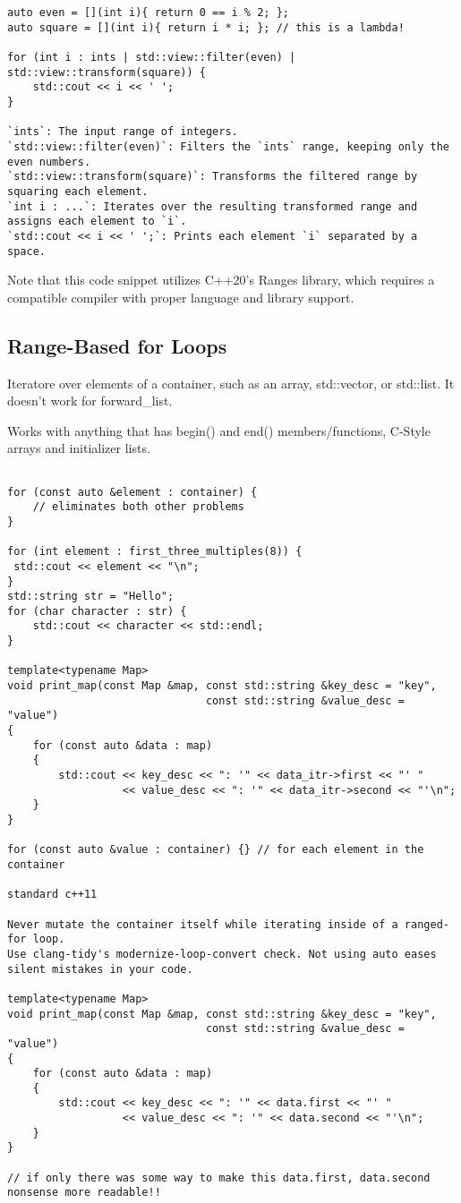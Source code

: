 \begin{verbatim}
auto even = [](int i){ return 0 == i % 2; };
auto square = [](int i){ return i * i; }; // this is a lambda!

for (int i : ints | std::view::filter(even) | std::view::transform(square)) {
    std::cout << i << ' ';
}

`ints`: The input range of integers.
`std::view::filter(even)`: Filters the `ints` range, keeping only the even numbers.
`std::view::transform(square)`: Transforms the filtered range by squaring each element.
`int i : ...`: Iterates over the resulting transformed range and assigns each element to `i`.
`std::cout << i << ' ';`: Prints each element `i` separated by a space.
\end{verbatim}

Note that this code snippet utilizes C++20's Ranges library, which requires a compatible compiler with proper language and library support.

\subsection{Range-Based for Loops}


Iteratore over elements of a container, such as an array, std::vector, or std::list. It doesn't work for forward\_list.


Works with anything that has begin()
and end() members/functions, C-Style arrays and initializer lists.

\begin{verbatim}

for (const auto &element : container) {
    // eliminates both other problems
}

for (int element : first_three_multiples(8)) {
 std::cout << element << "\n";
}
std::string str = "Hello";
for (char character : str) {
    std::cout << character << std::endl;
}

template<typename Map>
void print_map(const Map &map, const std::string &key_desc = "key",
                               const std::string &value_desc = "value")
{
    for (const auto &data : map)
    {
        std::cout << key_desc << ": '" << data_itr->first << "' "
                  << value_desc << ": '" << data_itr->second << "'\n";
    }
}

for (const auto &value : container) {} // for each element in the container

standard c++11

Never mutate the container itself while iterating inside of a ranged-for loop. 
Use clang-tidy's modernize-loop-convert check. Not using auto eases silent mistakes in your code.

template<typename Map>
void print_map(const Map &map, const std::string &key_desc = "key",
                               const std::string &value_desc = "value")
{
    for (const auto &data : map)
    {
        std::cout << key_desc << ": '" << data.first << "' "
                  << value_desc << ": '" << data.second << "'\n";
    }
}

// if only there was some way to make this data.first, data.second nonsense more readable!!
\end{verbatim}

